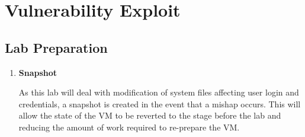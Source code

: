 \documentclass[a4paper,12pt]{article}
\begin{document}
	\section{Vulnerability Exploit}
	\subsection{Lab Preparation}\vspace{1em}
	\begin{enumerate}
		\item \textbf{Snapshot}\begin{par}
		As this lab will deal with modification of system files affecting user login and credentials, a snapshot is created in the event that a mishap occurs. This will allow the state of the VM to be reverted to the stage before the lab and reducing the amount of work required to re-prepare the VM.\end{par}
	\end{enumerate}
\newpage
\end{document}
